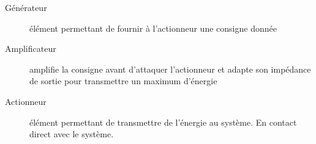 \documentclass[a4paper, 11pt]{article}
\begin{document}
\begin{description}
    \item[Générateur] élément permettant de fournir à l'actionneur une consigne donnée
    \item[Amplificateur] amplifie la consigne avant d'attaquer l'actionneur et adapte son impédance de sortie pour transmettre un maximum d'énergie
    \item[Actionneur] élément permettant de transmettre de l'énergie au système. En contact direct avec le système.
\end{description}
\end{document}
